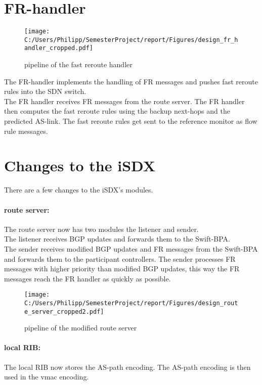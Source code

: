 \section{\label{chapter3:FR-handler}FR-handler}

\begin{figure}[h]
\center
\texttt{[image: C:/Users/Philipp/SemesterProject/report/Figures/design\_fr\_handler\_cropped.pdf]}
\caption{pipeline of the fast reroute handler}
\end{figure}

The FR-handler implements the handling of FR messages and pushes fast reroute rules into the SDN switch. \\
The FR handler receives FR messages from the route server. The FR handler then computes the fast reroute rules using the backup next-hops and the predicted AS-link. The fast reroute rules get sent to the reference monitor as flow rule messages.  

\newpage

\section{\label{chapter3:Changes to the iSDX}Changes to the iSDX}

There are a few changes to the iSDX's modules. 

\paragraph{\label{chapter3:Changes to the iSDX:route server}route server:}

The route server now has two modules the listener and sender. \\
The listener receives BGP updates and forwards them to the Swift-BPA. \\
The sender receives modified BGP updates and FR messages from the Swift-BPA and forwards them to the participant controllers. The sender processes FR messages with higher priority than modified BGP updates, this way the FR messages reach the FR handler as quickly as possible. 

\begin{figure}[h]
\center
\texttt{[image: C:/Users/Philipp/SemesterProject/report/Figures/design\_route\_server\_cropped2.pdf]}
\caption{pipeline of the modified route server}
\end{figure}


\paragraph{\label{chapter3:Changes to the iSDX:local RIB}local RIB:}
The local RIB now stores the AS-path encoding. The AS-path encoding is then used in the vmac encoding. 

